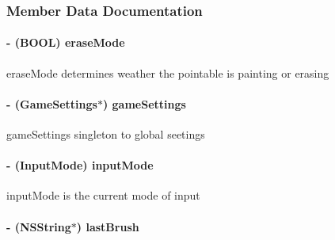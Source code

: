 \subsubsection{Member Data Documentation}
\hypertarget{interface_h_u_d_layer_aa1df984387a5f884acf38a7d733d6432}{
\paragraph[{erase\-Mode}]{\setlength{\rightskip}{0pt plus 5cm}-\/ (B\-O\-O\-L) erase\-Mode\hspace{0.3cm}{\ttfamily [protected]}}}\label{d3/d8a/interface_h_u_d_layer_aa1df984387a5f884acf38a7d733d6432}
erase\-Mode determines weather the pointable is painting or erasing \hypertarget{interface_h_u_d_layer_a69515b3bf7bddc07e65bad3eaa4a2e7a}{
\paragraph[{game\-Settings}]{\setlength{\rightskip}{0pt plus 5cm}-\/ ({\bf Game\-Settings}$\ast$) game\-Settings\hspace{0.3cm}{\ttfamily [protected]}}}\label{d3/d8a/interface_h_u_d_layer_a69515b3bf7bddc07e65bad3eaa4a2e7a}
game\-Settings singleton to global seetings \hypertarget{interface_h_u_d_layer_a1e506792d581032644d75804beb359a7}{
\paragraph[{input\-Mode}]{\setlength{\rightskip}{0pt plus 5cm}-\/ (Input\-Mode) input\-Mode\hspace{0.3cm}{\ttfamily [protected]}}}\label{d3/d8a/interface_h_u_d_layer_a1e506792d581032644d75804beb359a7}
input\-Mode is the current mode of input \hypertarget{interface_h_u_d_layer_ad7cb8a30419241ee8d2f2813031191be}{
\paragraph[{last\-Brush}]{\setlength{\rightskip}{0pt plus 5cm}-\/ (N\-S\-String$\ast$) last\-Brush\hspace{0.3cm}{\ttfamily [protected]}}}\label{d3/d8a/interface_h_u_d_layer_ad7cb8a30419241ee8d2f2813031191be}
